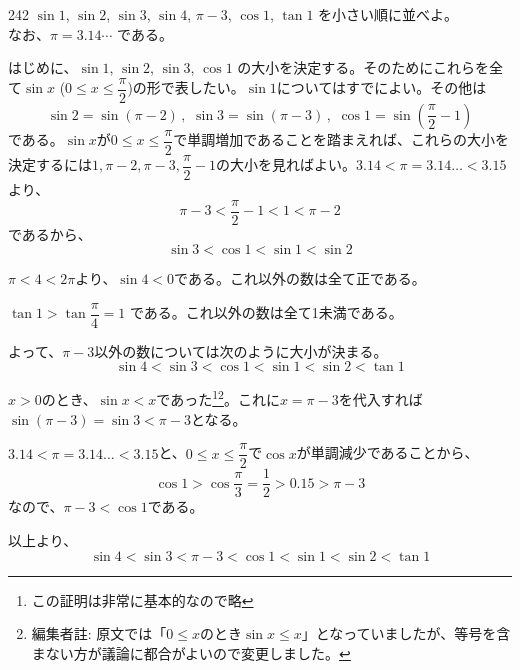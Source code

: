 \begin{thm}{242}{}{}
 $\sin 1$, $\sin 2$, $\sin 3$, $\sin 4$, $\pi-3$, $\cos 1$, $\tan 1$ を小さい順に並べよ。\\
 なお、$\pi=3.14\cdots$ である。
\end{thm}

はじめに、$\sin 1$, $\sin 2$, $\sin 3$, $\cos 1$ の大小を決定する。そのためにこれらを全て$\sin x$ ($0\le x\le \dfrac{\pi}{2}$)の形で表したい。$\sin 1$についてはすでによい。その他は
\[ \sin 2=\sin (\pi-2) \,,\,\, \sin 3=\sin (\pi-3) \,,\,\, \cos 1=\sin \left(\frac{\pi}{2}-1\right) \]
である。$\sin x$が$0\le x\le \dfrac{\pi}{2}$で単調増加であることを踏まえれば、これらの大小を決定するには$1, \pi-2, \pi-3, \dfrac{\pi}{2}-1$の大小を見ればよい。$3.14<\pi=3.14\dots <3.15$より、
\[ \pi-3 < \frac{\pi}{2}-1 < 1 < \pi-2 \]
であるから、
\[ \sin 3 < \cos 1 < \sin 1 < \sin 2 \]

$\pi < 4 < 2\pi$より、$\sin 4 < 0$である。これ以外の数は全て正である。

$\tan 1 > \tan\dfrac{\pi}{4}=1$ である。これ以外の数は全て1未満である。

よって、$\pi-3$以外の数については次のように大小が決まる。
\[ \sin 4 < \sin 3 < \cos 1 < \sin 1 < \sin 2 < \tan 1 \]

$x > 0$のとき、$\sin x < x$であった\footnote{この証明は非常に基本的なので略}\footnote{編集者註: 原文では「$0\le x$のとき$\sin x\le x$」となっていましたが、等号を含まない方が議論に都合がよいので変更しました。}。これに$x=\pi-3$を代入すれば$\sin (\pi-3)=\sin 3 < \pi -3$となる。

$3.14<\pi=3.14\dots <3.15$と、$0\le x\le \dfrac{\pi}{2}$で$\cos x$が単調減少であることから、
\[ \cos 1 > \cos \frac{\pi}{3}=\frac{1}{2} > 0.15 > \pi -3 \]
なので、$\pi -3 < \cos 1$である。

以上より、
\[ \sin 4 < \sin 3 < \pi -3 < \cos 1 < \sin 1 < \sin 2 < \tan 1 \]
